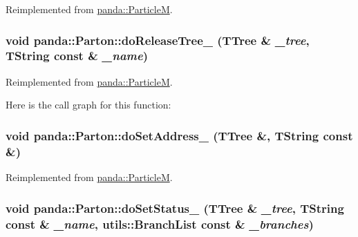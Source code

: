 Reimplemented from \hyperlink{classpanda_1_1ParticleM_ae912914e3970c1fb238589f0ccc783f4}{panda::ParticleM}.\hypertarget{classpanda_1_1Parton_af0f659274734074ab87ee05f4b1ee6d8}{
\subsubsection[{doReleaseTree\_\-}]{\setlength{\rightskip}{0pt plus 5cm}void panda::Parton::doReleaseTree\_\- (TTree \& {\em \_\-tree}, \/  TString const \& {\em \_\-name})}}
\label{classpanda_1_1Parton_af0f659274734074ab87ee05f4b1ee6d8}


Reimplemented from \hyperlink{classpanda_1_1ParticleM_a0c24df56cbd50a8223fc4d8bf0b776d0}{panda::ParticleM}.

Here is the call graph for this function:\hypertarget{classpanda_1_1Parton_a2ab83f4fa3a99a93c7bf17ab2233a25a}{
\subsubsection[{doSetAddress\_\-}]{\setlength{\rightskip}{0pt plus 5cm}void panda::Parton::doSetAddress\_\- (TTree \&, \/  TString const \&)}}
\label{classpanda_1_1Parton_a2ab83f4fa3a99a93c7bf17ab2233a25a}


Reimplemented from \hyperlink{classpanda_1_1ParticleM_ab54d46a237f8d12074ee36c48af33b04}{panda::ParticleM}.\hypertarget{classpanda_1_1Parton_a4471a7ad47570d85d6cd5ffa3c67b4d2}{
\subsubsection[{doSetStatus\_\-}]{\setlength{\rightskip}{0pt plus 5cm}void panda::Parton::doSetStatus\_\- (TTree \& {\em \_\-tree}, \/  TString const \& {\em \_\-name}, \/  {\bf utils::BranchList} const \& {\em \_\-branches})}}
\label{classpanda_1_1Parton_a4471a7ad47570d85d6cd5ffa3c67b4d2}



